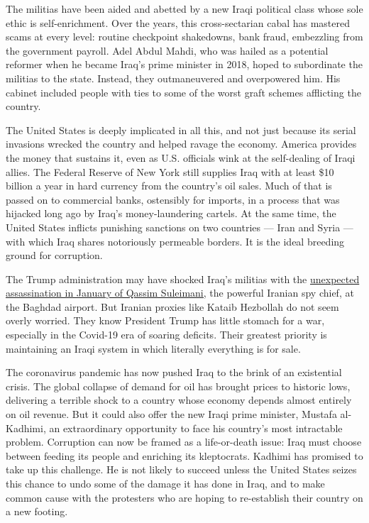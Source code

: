 The militias have been aided and abetted by a new Iraqi political class
whose sole ethic is self-enrichment. Over the years, this
cross-sectarian cabal has mastered scams at every level: routine
checkpoint shakedowns, bank fraud, embezzling from the government
payroll. Adel Abdul Mahdi, who was hailed as a potential reformer when
he became Iraq's prime minister in 2018, hoped to subordinate the
militias to the state. Instead, they outmaneuvered and overpowered him.
His cabinet included people with ties to some of the worst graft schemes
afflicting the country.

The United States is deeply implicated in all this, and not just because
its serial invasions wrecked the country and helped ravage the economy.
America provides the money that sustains it, even as U.S. officials wink
at the self-dealing of Iraqi allies. The Federal Reserve of New York
still supplies Iraq with at least \$10 billion a year in hard currency
from the country's oil sales. Much of that is passed on to commercial
banks, ostensibly for imports, in a process that was hijacked long ago
by Iraq's money-laundering cartels. At the same time, the United States
inflicts punishing sanctions on two countries --- Iran and Syria ---
with which Iraq shares notoriously permeable borders. It is the ideal
breeding ground for corruption.

The Trump administration may have shocked Iraq's militias with the
\href{https://www.nytimes.com/2020/01/11/us/politics/iran-trump.html}{unexpected
assassination in January of Qassim Suleimani,} the powerful Iranian spy
chief, at the Baghdad airport. But Iranian proxies like Kataib Hezbollah
do not seem overly worried. They know President Trump has little stomach
for a war, especially in the Covid-19 era of soaring deficits. Their
greatest priority is maintaining an Iraqi system in which literally
everything is for sale.

The coronavirus pandemic has now pushed Iraq to the brink of an
existential crisis. The global collapse of demand for oil has brought
prices to historic lows, delivering a terrible shock to a country whose
economy depends almost entirely on oil revenue. But it could also offer
the new Iraqi prime minister, Mustafa al-Kadhimi, an extraordinary
opportunity to face his country's most intractable problem. Corruption
can now be framed as a life-or-death issue: Iraq must choose between
feeding its people and enriching its kleptocrats. Kadhimi has promised
to take up this challenge. He is not likely to succeed unless the United
States seizes this chance to undo some of the damage it has done in
Iraq, and to make common cause with the protesters who are hoping to
re-establish their country on a new footing.

